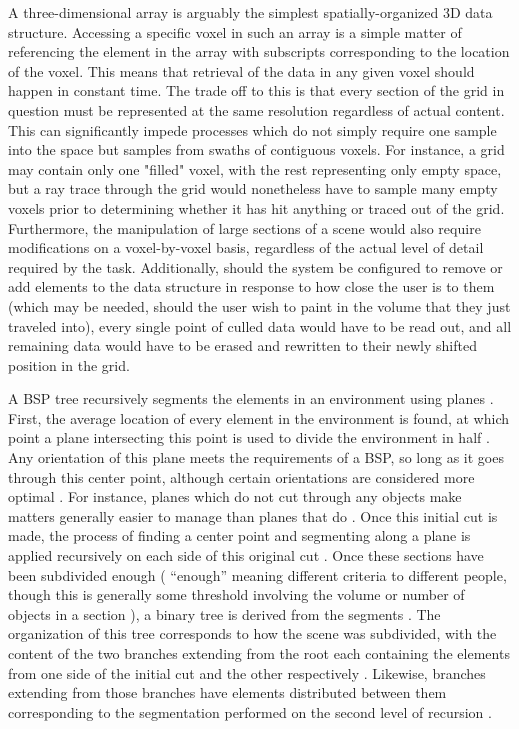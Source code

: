 \documentclass[onecolumn, draftclsnofoot,10pt, compsoc]{IEEEtran}
\newcounter{threesection}[subsubsection]
\begin{document}

A three-dimensional array is arguably the simplest spatially-organized 3D data structure.
Accessing a specific voxel in such an array is a simple matter of referencing the element in the array with subscripts corresponding to the location of the voxel.
This means that retrieval of the data in any given voxel should happen in constant time.
The trade off to this is that every section of the grid in question must be represented at the same resolution regardless of actual content.
This can significantly impede processes which do not simply require one sample into the space but samples from swaths of contiguous voxels.
For instance, a grid may contain only one "filled" voxel, with the rest representing only empty space, but a ray trace through the grid would nonetheless have to sample many empty voxels prior to determining whether it has hit anything or traced out of the grid.
Furthermore, the manipulation of large sections of a scene would also require modifications on a voxel-by-voxel basis, regardless of the actual level of detail required by the task.
Additionally, should the system be configured to remove or add elements to the data structure in response to how close the user is to them (which may be needed, should the user wish to paint in the volume that they just traveled into), every single point of culled data would have to be read out, and all remaining data would have to be erased and rewritten to their newly shifted position in the grid. 




A BSP tree recursively segments the elements in an environment using planes \cite{braxTech5}. 
First, the average location of every element in the environment is found, at which point a plane intersecting this point is used to divide the environment in half \cite{braxTech5}.
Any orientation of this plane meets the requirements of a BSP, so long as it goes through this center point, although certain orientations are considered more optimal \cite{braxTech5}.
For instance, planes which do not cut through any objects make matters generally easier to manage than planes that do \cite{braxTech5}.
Once this initial cut is made, the process of finding a center point and segmenting along a plane is applied recursively on each side of this original cut \cite{braxTech5}.
Once these sections have been subdivided enough ( “enough” meaning different criteria to different people, though this is generally some threshold involving the volume or number of objects in a section ), a binary tree is derived from the segments \cite{braxTech5}.
The organization of this tree corresponds to how the scene was subdivided, with the content of the two branches extending from the root each containing the elements from one side of the initial cut and the other respectively \cite{braxTech5}.
Likewise, branches extending from those branches have elements distributed between them corresponding to the segmentation performed on the second level of recursion \cite{braxTech5}.
\end{document}

